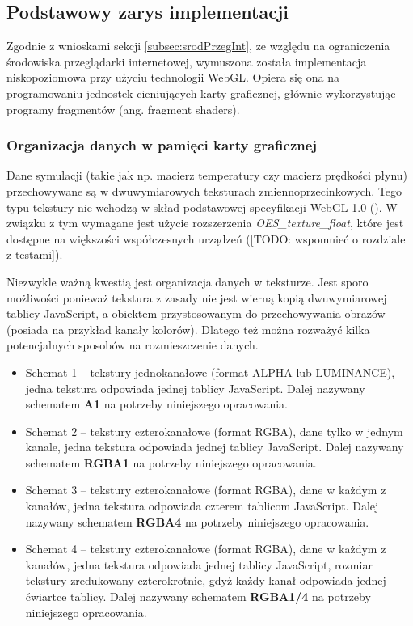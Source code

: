 \subsection{Podstawowy zarys implementacji}

Zgodnie z wnioskami sekcji \ref{subsec:srodPrzegInt}, ze względu na ograniczenia
środowiska przeglądarki internetowej, wymuszona została implementacja
niskopoziomowa przy użyciu technologii WebGL. Opiera się ona na programowaniu
jednostek cieniujących karty graficznej, głównie wykorzystując programy
fragmentów (ang. fragment shaders).

\subsubsection{Organizacja danych w pamięci karty graficznej}

Dane symulacji (takie jak np. macierz temperatury czy macierz prędkości płynu)
przechowywane są w dwuwymiarowych teksturach zmiennoprzecinkowych. Tego typu
tekstury nie wchodzą w skład podstawowej specyfikacji WebGL 1.0
(\cite{WebGLSpec}). W związku z tym wymagane jest użycie rozszerzenia
\emph{\mbox{OES\_texture\_float}}, które jest dostępne na większości
współczesnych urządzeń ([TODO: wspomnieć o rozdziale z testami]).

Niezwykle ważną kwestią jest organizacja danych w teksturze. Jest sporo
możliwości ponieważ tekstura z zasady nie jest wierną kopią dwuwymiarowej
tablicy JavaScript, a obiektem przystosowanym do przechowywania obrazów (posiada
na przykład kanały kolorów). Dlatego też można rozważyć kilka potencjalnych
sposobów na rozmieszczenie danych.

\begin{itemize}

\item Schemat 1 -- tekstury jednokanałowe (format ALPHA lub LUMINANCE), jedna
tekstura odpowiada jednej tablicy JavaScript. Dalej nazywany schematem
\textbf{A1} na potrzeby niniejszego opracowania.

\item Schemat 2 -- tekstury czterokanałowe (format RGBA), dane tylko w jednym
kanale, jedna tekstura odpowiada jednej tablicy JavaScript. Dalej nazywany
schematem \textbf{RGBA1} na potrzeby niniejszego opracowania.

\item Schemat 3 -- tekstury czterokanałowe (format RGBA), dane w każdym z
kanałów, jedna tekstura odpowiada czterem tablicom JavaScript. Dalej nazywany
schematem \textbf{RGBA4} na potrzeby niniejszego opracowania.

\item Schemat 4 -- tekstury czterokanałowe (format RGBA), dane w każdym z
kanałów, jedna tekstura odpowiada jednej tablicy JavaScript, rozmiar tekstury
zredukowany czterokrotnie, gdyż każdy kanał odpowiada jednej ćwiartce tablicy.
Dalej nazywany schematem \textbf{RGBA1/4} na potrzeby niniejszego opracowania.

\end{itemize}

